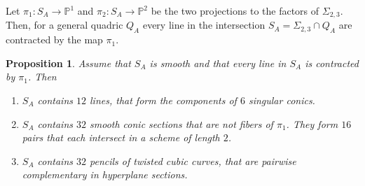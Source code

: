\documentclass[a4paper,11pt]{amsart}
\newtheorem{prop}[thm]{Proposition}
\theoremstyle{definition}
\numberwithin{equation}{section}
\numberwithin{equation}{section} \theoremstyle{definition}
\begin{document}
Let $\pi_1:S_A\to {{\mathbb{P}}}^1$ and $\pi_2:S_A\to {{\mathbb{P}}}^2$ be the two projections to the factors of $\Sigma_{2,3}$.  Then, for a general quadric $Q_A$ every line in the intersection $S_A =\Sigma_{2,3}\cap Q_A$ are contracted by the map $\pi_1$.  
\begin{prop}\label{32} Assume that $S_A$ is smooth and that every line in $S_A$ is contracted by $\pi_1$.  Then
\begin{enumerate}
\item $S_A$ contains $12$ lines, that form the components of $6$ singular conics. 
\item $S_A$ contains $32$ smooth conic sections  that are not fibers of $\pi_1$.  They form $16$ pairs that each intersect in a scheme of length $2$. 
\item $S_A$ contains $32$ pencils of twisted cubic curves, that are pairwise complementary in hyperplane sections. 
\end{enumerate}
\end{prop}
\end{document}
